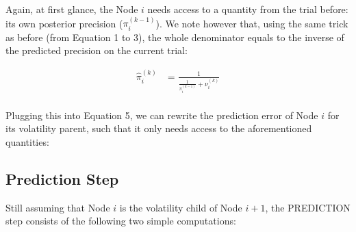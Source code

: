 \noindent
{}%
\vspace{0.5cm}

\noindent
Again, at first glance, the Node $i$ needs access to a quantity from the trial before: its own posterior precision ($\pi_i^{(k-1)}$). We note however that, using the same trick as before (from Equation 1 to 3), the whole denominator equals to the inverse of the predicted precision on the current trial: 

\begin{align*}
\hat{\pi}_{i}^{(k)} 			  &= \frac{1}{ \frac{1}{\pi_{i}^{(k-1)}}
								  + \nu_{i}^{(k)} }\\
\end{align*}

Plugging this into Equation 5, we can rewrite the prediction error of Node $i$ for its volatility parent, such that it only needs access to the aforementioned quantities:
\vspace{0.5cm}

\noindent
{}%
\vspace{0.5cm}

\noindent

\subsection{Prediction Step}
Still assuming that Node $i$ is the volatility child of Node $i+1$, the \textsf{PREDICTION step} consists of the following two simple computations:
\vspace{0.5cm}

